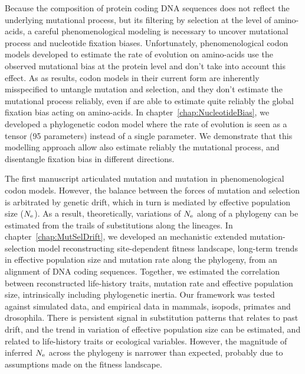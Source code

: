 Because the composition of protein coding DNA sequences does not reflect the underlying mutational process, but its filtering by selection at the level of amino-acids, a careful phenomenological modeling is necessary to uncover mutational process and nucleotide fixation biases.
Unfortunately, phenomenological \gls{codon} models developed to estimate the rate of evolution on amino-acids use the observed mutational bias at the protein level and don't take into account this effect.
As as results, \gls{codon} models in their current form are inherently misspecified to untangle mutation and selection, and they don’t estimate the mutational process reliably, even if are able to estimate quite reliably the global fixation bias acting on amino-acids.
In chapter~\ref{chap:NucleotideBias}, we developed a phylogenetic codon model where the rate of evolution is seen as a tensor (95 parameters) instead of a single parameter.
We demonstrate that this modelling approach allow also estimate reliably the mutational process, and disentangle fixation bias in different directions.

The first manuscript articulated mutation and mutation in phenomenological codon models.
However, the balance between the forces of mutation and selection is arbitrated by genetic drift, which in turn is mediated by effective population size ($N_{\textrm{e}}$).
As a result, theoretically, variations of $N_{\textrm{e}}$ along of a phylogeny can be estimated from the trails of substitutions along the lineages.
In chapter~\ref{chap:MutSelDrift}, we developed an mechanistic extended mutation-selection model reconstructing site-dependent fitness landscape, long-term trends in effective population size and mutation rate along the phylogeny, from an alignment of DNA coding sequences.
Together, we estimated the correlation between reconstructed life-history traits, mutation rate and effective population size, intrinsically including phylogenetic inertia.
Our framework was tested against simulated data, and empirical data in mammals, isopods, primates and drosophila.
There is persistent signal in substitution patterns that relates to past drift, and the trend in variation of effective population size can be estimated, and related to life-history traits or ecological variables.
However, the magnitude of inferred $N_{\textrm{e}}$ across the phylogeny is narrower than expected, probably due to assumptions made on the fitness landscape.

